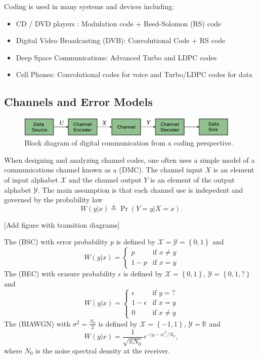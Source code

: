 Coding is used in many systems and devices including:
\begin{itemize}
\item CD / DVD players : Modulation code + Reed-Solomon (RS) code
\item Digital Video Broadcasting (DVB): Convolutional Code + RS code
\item Deep Space Communications: Advanced Turbo and LDPC codes
\item Cell Phones: Convolutional codes for voice and Turbo/LDPC codes for data
\end{itemize}

\subsection{Channels and Error Models}

\begin{figure}[t]
\begin{center}
\includegraphics[width=0.95\textwidth,keepaspectratio]{Figures/commfig2}
\end{center}
\vspace{-4mm}
\caption{Block diagram of digital communication from a coding perspective.}
\end{figure}

When designing and analyzing channel codes, one often uses a simple model of a communications channel known as a  (DMC).
The channel input $X$ is an element of input alphabet $\mathcal{X}$ and the channel output $Y$ is an element of the output alphabet $\mathcal{Y}$.
The main assumption is that each channel use is indepedent and governed by the probability law
\[ W(y|x) \triangleq \Pr\left(Y=y|X=x\right).\]

[Add figure with transition diagrams]

The  (BSC) with error probability $p$ is defined by $\mathcal{X}=\mathcal{Y}=\left\{ 0,1\right\} $ and
\[ W(y|x)=\begin{cases}
p & \mbox{if }x\neq y\\
1-p & \mbox{if }x=y\end{cases}\]
The  (BEC) with erasure probability $\epsilon$ is defined by $\mathcal{X}=\left\{ 0,1\right\} $, $\mathcal{Y}=\left\{ 0,1,?\right\}$ and
\[ W(y|x)=\begin{cases}
\epsilon & \mbox{if }y=?\\
1-\epsilon & \mbox{if }x=y\\
0 & \mbox{if }x\neq y\end{cases}\]
The  (BIAWGN) with $\sigma^{2}=\frac{N_{0}}{2}$ is defined by $\mathcal{X}=\left\{ -1,1\right\} $, $\mathcal{Y}=\mathbb{R}$ and
\[ W(y|x)=\frac{1}{\sqrt{\pi N_{0}}}e^{-\left|y-x\right|^{2}/N_{0}},\]
where $N_{0}$ is the noise spectral density at the receiver.

